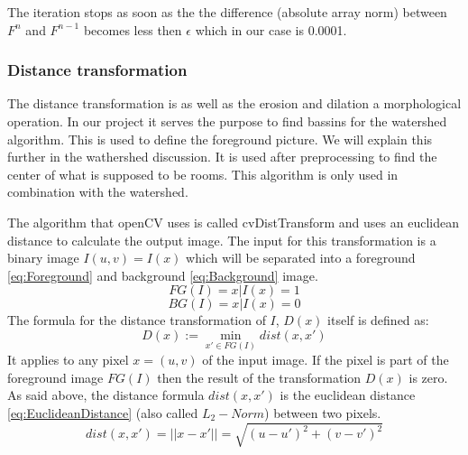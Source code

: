 The iteration stops as soon as the the difference (absolute array norm) between $F^{n}$ and $F^{n-1}$ becomes less then $\epsilon$ which in our case is 0.0001.

\subsubsection{Distance transformation}
\label{subsubsec:Distance transformation}
The distance transformation is as well as the erosion and dilation a morphological operation. In our project it serves the purpose to find bassins for the watershed algorithm. This is used to define the foreground picture. We will explain this further in the wathershed discussion.
It is used after preprocessing to find the center of what is supposed to be rooms. This algorithm is only used in combination with the watershed.

The algorithm that openCV uses is called cvDistTransform and uses an euclidean distance to calculate the output image. The input for this transformation is a binary image $I(u,v) = I(x)$ which will be separated into a foreground \eqref{eq:Foreground} and background \eqref{eq:Background} image.
\begin{equation}\label{eq:Foreground}FG(I) = {x | I(x) = 1}\end{equation}
\begin{equation}\label{eq:Background}BG(I) = {x | I(x) = 0}\end{equation}
The formula for the distance transformation of $I$, $D(x)$ itself is defined as:
\[D(x) :=\min_{x' \in FG(I)} dist(x,x') \]
It applies to any pixel $x = (u,v)$ of the input image. If the pixel is part of the foreground image $FG(I)$ then the result of the transformation $D(x)$ is zero. As said above, the distance formula $dist(x,x')$ is the euclidean distance \eqref{eq:EuclideanDistance} (also called $L_{2}-Norm$) between two pixels.
\begin{equation}\label{eq:EuclideanDistance}dist(x,x') = ||x - x'|| = \sqrt{(u - u')^2 + (v - v')^2}\end{equation}

